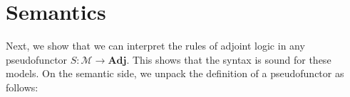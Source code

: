 \documentclass{drl-common/llncs}
\newcommand{\M}{\ensuremath{\mathcal{M}}}
\newcommand{\Adj}{\textbf{Adj}}
\begin{document}
\section{Semantics}
\label{sec:semantics}

\newcommand\semF[2]{\ensuremath{\mathcal{F}_{#1} \,\, #2}}
\newcommand\semU[2]{\ensuremath{\mathcal{U}_{#1} \,\, #2}}
\newcommand\semFo[1]{\ensuremath{{\mathcal{F}_{#1}}}}
\newcommand\semUo[1]{\ensuremath{\mathcal{U}_{#1}}}
\newcommand\semFone{\ensuremath{{\mathcal{F}^1}}}
\newcommand\semUone{\ensuremath{{\mathcal{U}^1}}}
\newcommand\semUcomp{\ensuremath{\mathcal{U}^\circ}}
\newcommand\semFcomp{\ensuremath{\mathcal{F}^\circ}}
\newcommand\semltor[2]{\ensuremath{#1^{\vartriangleright_{#2}}}}
\newcommand\semrtol[2]{\ensuremath{#1^{\vartriangleleft_{#2}}}}

Next, we show that we can interpret the rules of adjoint logic in any
pseudofunctor $S : \M \to \Adj$.  This shows that the syntax is sound
for these models.  On the semantic side, we unpack the definition of a
pseudofunctor as follows:
\end{document}
